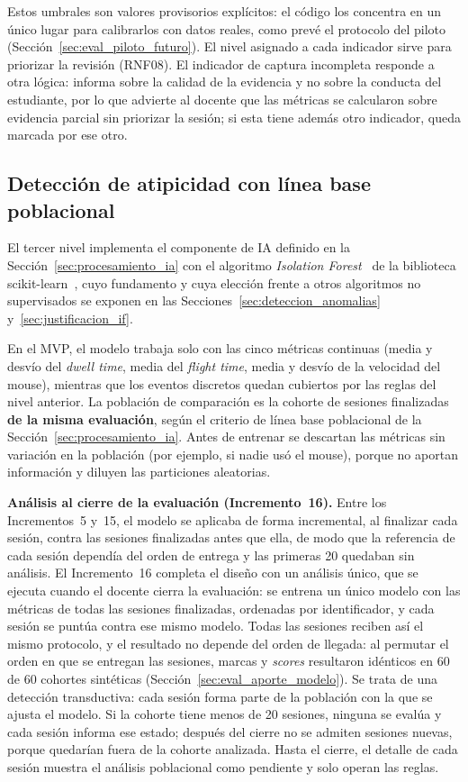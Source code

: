 Estos umbrales son valores provisorios explícitos: el código los concentra en un único lugar para calibrarlos con datos reales, como prevé el protocolo del piloto (Sección~\ref{sec:eval_piloto_futuro}). El nivel asignado a cada indicador sirve para priorizar la revisión (RNF08). El indicador de captura incompleta responde a otra lógica: informa sobre la calidad de la evidencia y no sobre la conducta del estudiante, por lo que advierte al docente que las métricas se calcularon sobre evidencia parcial sin priorizar la sesión; si esta tiene además otro indicador, queda marcada por ese otro.

\subsection{Detección de atipicidad con línea base poblacional}
\label{sec:impl_isolation_forest}

El tercer nivel implementa el componente de IA definido en la Sección~\ref{sec:procesamiento_ia} con el algoritmo \textit{Isolation Forest}~\parencite{Liu2008, Liu2012} de la biblioteca scikit-learn~\parencite{Pedregosa2011}, cuyo fundamento y cuya elección frente a otros algoritmos no supervisados se exponen en las Secciones~\ref{sec:deteccion_anomalias} y~\ref{sec:justificacion_if}.

En el MVP, el modelo trabaja solo con las cinco métricas continuas (media y desvío del \textit{dwell time}, media del \textit{flight time}, media y desvío de la velocidad del mouse), mientras que los eventos discretos quedan cubiertos por las reglas del nivel anterior. La población de comparación es la cohorte de sesiones finalizadas \textbf{de la misma evaluación}, según el criterio de línea base poblacional de la Sección~\ref{sec:procesamiento_ia}. Antes de entrenar se descartan las métricas sin variación en la población (por ejemplo, si nadie usó el mouse), porque no aportan información y diluyen las particiones aleatorias.

\textbf{Análisis al cierre de la evaluación (Incremento~16).} Entre los Incrementos~5 y~15, el modelo se aplicaba de forma incremental, al finalizar cada sesión, contra las sesiones finalizadas antes que ella, de modo que la referencia de cada sesión dependía del orden de entrega y las primeras 20 quedaban sin análisis. El Incremento~16 completa el diseño con un análisis único, que se ejecuta cuando el docente cierra la evaluación: se entrena un único modelo con las métricas de todas las sesiones finalizadas, ordenadas por identificador, y cada sesión se puntúa contra ese mismo modelo. Todas las sesiones reciben así el mismo protocolo, y el resultado no depende del orden de llegada: al permutar el orden en que se entregan las sesiones, marcas y \textit{scores} resultaron idénticos en 60 de 60 cohortes sintéticas (Sección~\ref{sec:eval_aporte_modelo}). Se trata de una detección transductiva: cada sesión forma parte de la población con la que se ajusta el modelo. Si la cohorte tiene menos de 20 sesiones, ninguna se evalúa y cada sesión informa ese estado; después del cierre no se admiten sesiones nuevas, porque quedarían fuera de la cohorte analizada. Hasta el cierre, el detalle de cada sesión muestra el análisis poblacional como pendiente y solo operan las reglas.

